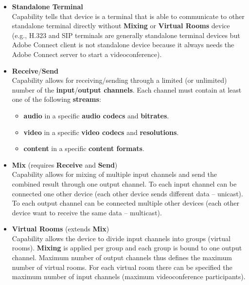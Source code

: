 \begin{itemize}
\newcommand{\RequireCapability}[1]{(requires #1)}
\newcommand{\ExtendCapability}[1]{(extends #1)}

\item \textbf{Standalone Terminal} \\
  Capability tells that device is a terminal that is able to communicate to
  other standalone terminal directly without \textbf{Mixing} or 
  \textbf{Virtual Rooms} device (e.g., H.323 and SIP terminals are generally 
  standalone terminal devices but Adobe Connect client is not standalone 
  device because it always needs the Adobe Connect server to start a 
  videoconference).
  
\item \textbf{Receive}/\textbf{Send} \\
  Capability allows for receiving/sending through a limited (or unlimited) 
  number of the \textbf{input}/\textbf{output channels}. Each channel must 
  contain at least one of the following \textbf{streams}:
  \begin{itemize}
    \item \textbf{audio} in a specific \textbf{audio codecs} and 
      \textbf{bitrates}.
    \item \textbf{video} in a specific \textbf{video codecs} and 
      \textbf{resolutions}.
    \item \textbf{content} in a specific \textbf{content formats}.
  \end{itemize} 
  
\item \textbf{Mix} \RequireCapability{\textbf{Receive} and \textbf{Send}} \\
  Capability allows for mixing of multiple input channels and send 
  the combined result through one output channel. To each input channel can be 
  connected one other device (each other device sends different data -- 
  unicast). To each output channel can be connected multiple other devices 
  (each other device want to receive the same data -- multicast).

\item \textbf{Virtual Rooms} \ExtendCapability{\textbf{Mix}} \\
  Capability allows the device to divide input channels into groups (virtual 
  rooms). \textbf{Mixing} is applied per group and each group 
  is bound to one output channel. Maximum number of output channels thus 
  defines the maximum number of virtual rooms. For each virtual room there can 
  be specified the maximum number of input channels (maximum videoconference 
  participants).


\end{itemize}
